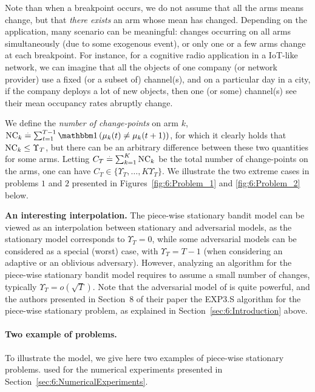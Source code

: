 Note than when a breakpoint occurs, we do not assume that all the arms means  change, but that \emph{there exists} an arm whose mean has changed.
Depending on the application, many scenario can be meaningful: changes occurring on all arms simultaneously (due to some exogenous event), or only one or a few arms change at each breakpoint.
For instance, for a cognitive radio application in a IoT-like network, we can imagine that all the objects of one company (or network provider) use a fixed (or a subset of) channel(s), and on a particular day in a city, if the company deploys a lot of new objects, then one (or some) channel(s) see their mean occupancy rates abruptly change.

We define the \emph{number of change-points} on arm $k$,
$\NCk \eqdef \sum_{t=1}^{T-1} \indic\left(\mu_k(t) \neq \mu_k(t+1)\right)$,
for which it clearly holds that
$\text{NC}_k \leq \Upsilon_T$, but there can be an arbitrary difference between these two quantities for some arms. Letting $C_T \overset{.}{=} \sum_{k=1}^K \text{NC}_k$ be the total number of change-points on the arms, one can have $C_T \in \{ \Upsilon_T, \dots, K\Upsilon_T \}$.
We illustrate the two extreme cases in problems $1$ and $2$ presented in Figures~\ref{fig:6:Problem_1} and \ref{fig:6:Problem_2} below.


\textbf{An interesting interpolation.}
%
The piece-wise stationary bandit model can be viewed as an interpolation between stationary and adversarial models, as the stationary model corresponds to $\Upsilon_T = 0$, while some adversarial models can be considered as a special (worst) case, with $\Upsilon_T = T-1$ (when considering an adaptive or an oblivious adversary).
However, analyzing an algorithm for the piece-wise stationary bandit model requires to assume a small number of changes, typically $\Upsilon_T = o(\sqrt{T})$.
Note that the adversarial model of \cite{Auer02NonStochastic} is quite powerful, and the authors presented in Section~8 of their paper the EXP3.S algorithm for the piece-wise stationary problem, as explained in Section~\ref{sec:6:Introduction} above.


\paragraph{Two example of problems.}\label{par:6:benchmark1}
%
To illustrate the model, we give here two examples of piece-wise stationary problems.
used for the numerical experiments presented in Section~\ref{sec:6:NumericalExperiments}.

